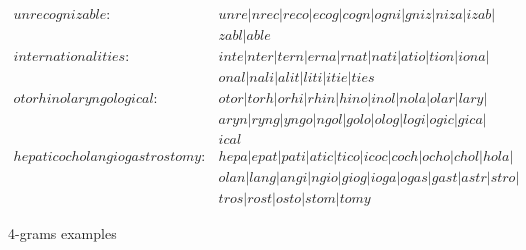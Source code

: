        \begin{figure}
            \begin{align*}
                unrecognizable : &unre \vert nrec \vert reco \vert ecog \vert cogn \vert ogni \vert gniz \vert niza \vert izab \vert\\ 
                &zabl \vert able\\
                internationalities : &inte \vert nter \vert tern \vert erna \vert rnat \vert nati \vert atio \vert tion \vert iona \vert\\
                &onal \vert nali \vert alit \vert liti \vert itie \vert ties\\
                otorhinolaryngological : &otor \vert torh \vert orhi \vert rhin \vert hino \vert inol \vert nola \vert olar \vert lary \vert \\
                &aryn \vert ryng \vert yngo \vert ngol \vert golo \vert olog \vert logi \vert ogic \vert gica \vert\\
                &ical\\
                hepaticocholangiogastrostomy : &hepa \vert epat \vert pati \vert atic \vert tico \vert icoc \vert coch \vert ocho \vert chol \vert hola \vert\\
                & olan \vert lang \vert angi \vert ngio \vert giog \vert ioga \vert ogas \vert gast \vert astr \vert stro \vert\\
                &tros \vert rost \vert osto \vert stom \vert tomy
            \end{align*}
            \caption{4-grams examples}
            \label{fig:4grams}
        \end{figure}

